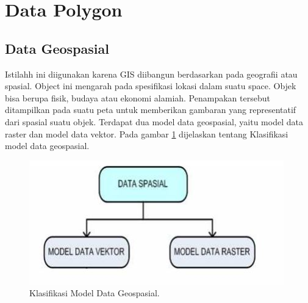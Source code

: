 
\section{Data Polygon}
\subsection{Data Geospasial}
Istilahh ini diigunakan karena GIS diibangun berdasarkan pada geografii atau spasial. Object ini mengarah pada spesifikasi lokasi dalam suatu space. Objek bisa berupa fisik, budaya atau ekonomi alamiah. Penampakan tersebut ditampilkan pada suatu peta untuk memberikan gambaran yang representatif dari spasial suatu objek.
Terdapat dua model data geospasial, yaitu model data raster dan model data vektor. 
Pada gambar \ref{datageospasial} dijelaskan tentang Klasifikasi model data geospasial.
\begin{figure}[ht]
	\centerline{\includegraphics[width=.5\textwidth]{figures/datageospasial.JPG}}
	\caption{Klasifikasi Model Data Geospasial.}
	\label{datageospasial}
	\end{figure}

